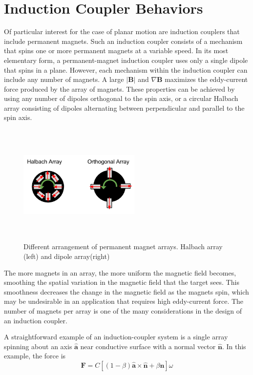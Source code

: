 \section{Induction Coupler Behaviors}

Of particular interest for the case of planar motion are induction couplers that include permanent magnets. Such an induction coupler consists of a mechanism that spins one or more permanent magnets at a variable speed. In its most elementary form, a permanent-magnet induction coupler uses only a single dipole that spins in a plane. However, each mechanism within the induction coupler can include any number of magnets. A large $\vert \textbf{B} \vert$ and $\nabla \textbf{B}$ maximizes the eddy-current force produced by the array of magnets. These properties can be achieved by using any number of dipoles orthogonal to the spin axis, or a circular Halbach array consisting of dipoles alternating between perpendicular and parallel to the spin axis.

\begin{figure}
\includegraphics[width = 6cm, height = 6cm ]{figures/Magnet_Arrays.png}

\caption{Different arrangement of permanent magnet arrays. Halbach array (left) and dipole array(right)}
\label{fig:magnet_arrays}
\end{figure}

The more magnets in an array, the more uniform the magnetic field becomes, smoothing the spatial variation in the magnetic field that the target sees. This smoothness decreases the change in the magnetic field as the magnets spin, which may be undesirable in an application that requires high eddy-current force. The number of magnets per array is one of the many considerations in the design of an induction coupler.

A straightforward example of an induction-coupler system is a single array spinning about an axis $\hat{\boldsymbol{a}}$ near conductive surface with a normal vector $\hat{\boldsymbol{n}}$. In this example, the force is 
\begin{equation}\label{eq:singlemagforce}
\textbf{F} = C\left[  \left(1-\beta \right )\hat{\boldsymbol{a}}{\times}\hat{\boldsymbol{n}} + \beta\hat{\boldsymbol{n}} \right ] \omega
\end{equation}


